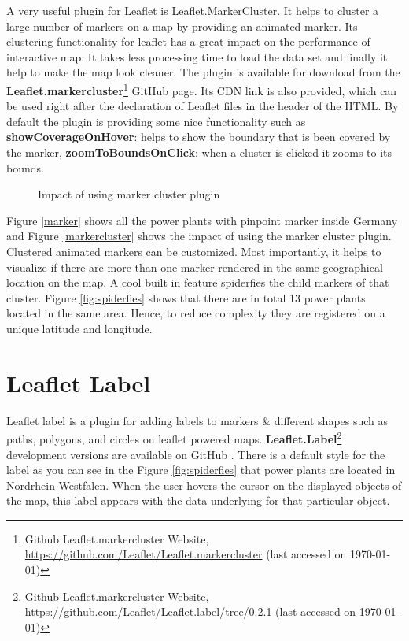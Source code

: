A very useful plugin for Leaflet is Leaflet.MarkerCluster. It helps to cluster a large number of markers on a map by providing an animated marker. Its clustering functionality for leaflet has a great impact on the performance of interactive map. It takes less processing time to load the data set and finally it help to make the map look cleaner. The plugin is available for download from the \textbf{Leaflet.markercluster}\footnote{Github Leaflet.markercluster Website, \url{https://github.com/Leaflet/Leaflet.markercluster} (last accessed on \today)} GitHub page. Its CDN link is also provided, which can be used right after the declaration of Leaflet files in the header of the HTML. By default the plugin is providing some nice functionality such as \textbf{showCoverageOnHover}: helps to show the boundary that is been covered by the marker, \textbf{zoomToBoundsOnClick}: when a cluster is clicked it zooms to its bounds.

\begin{figure}[H]
  \begin{center}
\hfill
{}
\hfill
\caption{Impact of using marker cluster plugin}
\end{center}
\end{figure}

Figure \ref{marker} shows all the power plants with pinpoint marker inside Germany and Figure \ref{markercluster} shows the impact of using the marker cluster plugin. Clustered animated markers can be customized. Most importantly, it helps to visualize if there are more than one marker rendered in the same geographical location on the map. A cool built in feature spiderfies the child markers of that cluster. Figure \ref{fig:spiderfies} shows that there are in total 13 power plants located in the same area. Hence, to reduce complexity they are registered on a unique latitude and longitude.

\section*{Leaflet Label}

Leaflet label is a plugin for adding labels to markers \& different shapes such as paths, polygons, and circles on leaflet powered maps. \textbf{Leaflet.Label}\footnote{Github Leaflet.markercluster Website, \url{https://github.com/Leaflet/Leaflet.label/tree/0.2.1
} (last accessed on {\today})} development versions are available on GitHub . There is a default style for the label as you can see in the Figure \ref{fig:spiderfies} that power plants are located in Nordrhein-Westfalen. When the user hovers the cursor on the displayed objects of the map, this label appears with the data underlying for that particular object.

